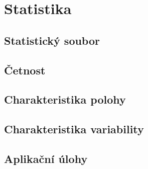 
\newpage
    \section{Statistika}
        \subsection{Statistický soubor}
        \subsection{Četnost}
        \subsection{Charakteristika polohy}
        \subsection{Charakteristika variability}
        \subsection{Aplikační úlohy}
